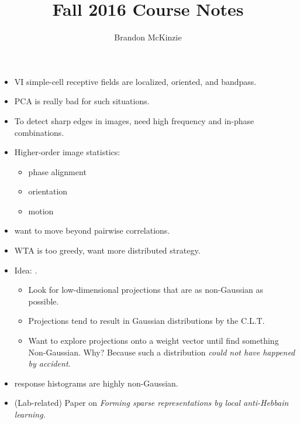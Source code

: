 \documentclass[12pt]{article}
\title{\vspace{-10mm}\fontsize{24pt}{8pt}\selectfont\textbf{Fall 2016 Course Notes}\vspace*{-4mm}}
\author{Brandon McKinzie}
\date{}
\begin{document}
\dosecttoc
	

\label{Neural Computation}



\begin{itemize}
	\item VI simple-cell receptive fields are localized, oriented, and bandpass. 
	\item PCA is really bad for such situations. 
	\item To detect sharp edges in images, need high frequency and in-phase combinations.
	\item Higher-order image statistics:
	\begin{itemize}
		\item phase alignment
		\item orientation 
		\item motion
	\end{itemize}
	\item want to move beyond pairwise correlations. 
	\item WTA is too greedy, want more distributed strategy. 
	\item Idea: . 
	\begin{itemize}
		\item Look for low-dimensional projections that are as non-Gaussian as possible. 
		\item Projections tend to result in Gaussian distributions by the C.L.T. 
		\item Want to explore projections onto a weight vector until find something Non-Gaussian. Why? Because such a distribution \emph{could not have happened by accident}. 
	\end{itemize}
	\item {} response histograms are highly non-Gaussian.
	\item (Lab-related) Paper on \textit{Forming sparse representations by local anti-Hebbain learning.}
	\begin{itemize}

\end{itemize}
\end{itemize}
\end{document}
